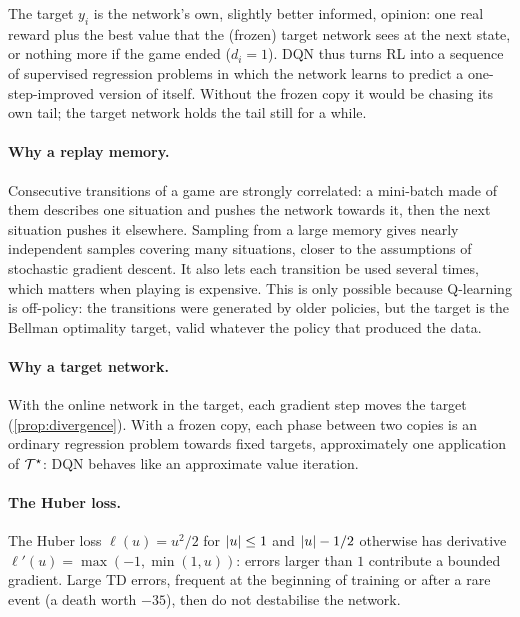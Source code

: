 \begin{intuition}
  The target $y_i$ is the network's own, slightly better informed, opinion:
  one real reward plus the best value that the (frozen) target network sees
  at the next state, or nothing more if the game ended ($d_i = 1$). DQN thus
  turns RL into a sequence of supervised regression problems in which the
  network learns to predict a one-step-improved version of itself.
  Without the frozen copy it would be chasing its own tail; the target
  network holds the tail still for a while.
\end{intuition}

\paragraph{Why a replay memory.} Consecutive transitions of a game are
strongly correlated: a mini-batch made of them describes one situation and
pushes the network towards it, then the next situation pushes it
elsewhere. Sampling from a large memory gives nearly independent samples
covering many situations, closer to the assumptions of stochastic gradient
descent. It also lets each transition be used several times, which matters
when playing is expensive. This is only possible because Q-learning is
off-policy: the transitions were generated by older policies, but the
target is the Bellman optimality target, valid whatever the policy that
produced the data.

\paragraph{Why a target network.} With the online network in the target,
each gradient step moves the target (\cref{prop:divergence}). With a frozen
copy, each phase between two copies is an ordinary regression problem
towards fixed targets, approximately one application of $\mathcal{T}^\star$:
DQN behaves like an approximate value iteration.

\paragraph{The Huber loss.} The Huber loss $\ell(u) = u^2 / 2$ for $\left\lvert u \right\rvert
\leq 1$ and $\left\lvert u \right\rvert - 1/2$ otherwise has derivative $\ell'(u) = \max(-1,
\min(1, u))$: errors larger than $1$ contribute a bounded gradient. Large TD
errors, frequent at the beginning of training or after a rare event (a
death worth $-35$), then do not destabilise the network.

